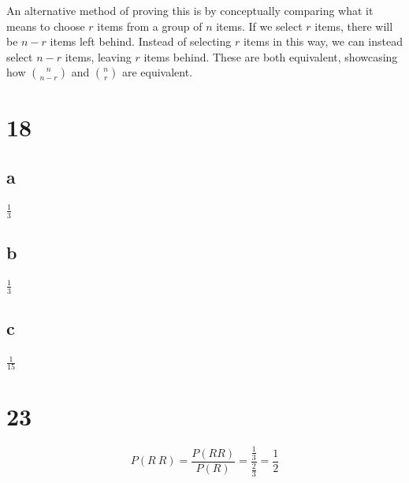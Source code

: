 \documentclass[12pt]{article}
\begin{document}
  An alternative method of proving this is by conceptually comparing what it means to choose $r$ items from a group of $n$ items. If we select $r$ items, there will be $n-r$ items left behind. Instead of selecting $r$ items in this way, we can instead select $n-r$ items, leaving $r$ items behind. These are both equivalent, showcasing how $\binom{n}{n-r}$ and $\binom{n}{r}$ are equivalent.

  \section*{18}
  \subsection*{a}
  $\frac{1}{3}$
  \subsection*{b}
  $\frac{1}{3}$
  \subsection*{c}
  $\frac{1}{15}$

  \section*{23}
  $$ P(R \ R) = \frac{P(RR)}{P(R)} = \frac{\frac{1}{3}}{\frac{2}{3}} = \frac{1}{2}$$
\end{document}
